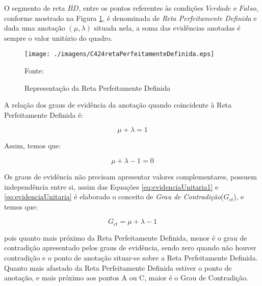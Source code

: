 O segmento de reta $\overline{BD}$, entre os pontos referentes às condições $Verdade$ e $Falso$, conforme mostrado na Figura \ref{fig:retaPerfeitamenteDefinida}, é denominada de \emph{Reta Perfeitamente Definida} e dada uma anotação $(\mu, \lambda )$ situada nela, a soma das evidências anotadas é sempre o valor unitário do quadro. 

\begin{figure}[!htb]
\caption{Representação da Reta Perfeitamente Definida}
\center\texttt{[image: ./imagens/C424retaPerfeitamenteDefinida.eps]}
\label{fig:retaPerfeitamenteDefinida}

{\small Fonte: \cite{JoaoInacio}}
\end{figure}

A relação dos graus de evidência da anotação quando coincidente à Reta Perfeitamente Definida é: 

\begin{center}
\begin{equation}
\mu + \lambda = 1
\label{eq:evidenciaUnitaria1}
\end{equation}
\end{center}

Assim, temos que:

\begin{center}
\begin{equation}
\mu + \lambda - 1 = 0
\label{eq:evidenciaUnitaria}
\end{equation}
\end{center}


Os graus de evidência não precisam apresentar valores complementares, possuem independência entre si, assim das Equações  
\ref{eq:evidenciaUnitaria1} e 
\ref{eq:evidenciaUnitaria} 
é elaborado o conceito de 
\emph{Grau de Contradição}($G_{ct}$), 
e temos que: 

\begin{center}
\begin{equation}
G _{ct} = \mu + \lambda - 1
\label{eq:grauIncerteza}
\end{equation}
\end{center}

pois quanto mais próximo da Reta Perfeitamente Definida, menor é o grau de contradição apresentado pelos graus de evidência, sendo zero quando não houver contradição e o ponto de anotação situar-se sobre a Reta Perfeitamente Definida. 
Quanto mais afastado da Reta Perfeitamente Definida estiver o ponto de anotação, e mais próximo aos pontos A ou C, maior é o Grau de Contradição. 


